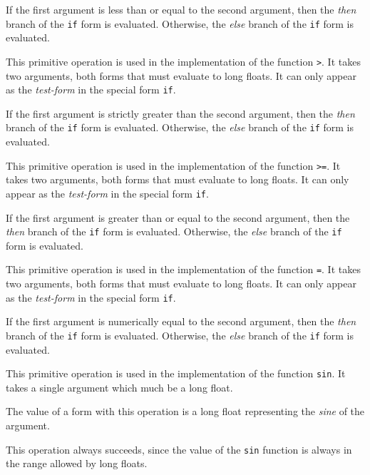 If the first argument is less than or equal to the second argument,
then the \emph{then} branch of the \texttt{if} form is evaluated.
Otherwise, the \emph{else} branch of the \texttt{if} form is
evaluated.

 {}

This primitive operation is used in the implementation of the
\commonlisp{} function \texttt{>}.  It takes two arguments, both forms
that must evaluate to long floats.  It can only appear as the
\emph{test-form} in the special form \texttt{if}.

If the first argument is strictly greater than the second argument,
then the \emph{then} branch of the \texttt{if} form is evaluated.
Otherwise, the \emph{else} branch of the \texttt{if} form is
evaluated.

 {}

This primitive operation is used in the implementation of the
\commonlisp{} function \texttt{>=}.  It takes two arguments, both forms
that must evaluate to long floats.  It can only appear as the
\emph{test-form} in the special form \texttt{if}.

If the first argument is greater than or equal to the second argument,
then the \emph{then} branch of the \texttt{if} form is evaluated.
Otherwise, the \emph{else} branch of the \texttt{if} form is
evaluated.

 {}

This primitive operation is used in the implementation of the
\commonlisp{} function \texttt{=}.  It takes two arguments, both forms
that must evaluate to long floats.  It can only appear as the
\emph{test-form} in the special form \texttt{if}.

If the first argument is numerically equal to the second argument,
then the \emph{then} branch of the \texttt{if} form is evaluated.
Otherwise, the \emph{else} branch of the \texttt{if} form is
evaluated.

 {}

This primitive operation is used in the implementation of the
\commonlisp{} function \texttt{sin}.  It takes a single argument which
much be a long float.

The value of a form with this operation is a long float representing
the \emph{sine} of the argument.

This operation always succeeds, since the value of the \texttt{sin}
function is always in the range allowed by long floats.

